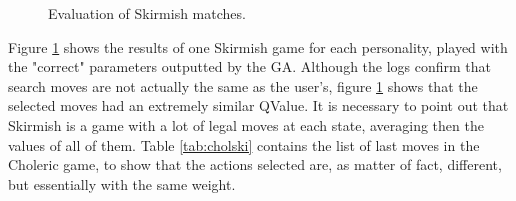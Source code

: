 \begin{figure}[ht!]
	\quad
  \captionsetup{justification=centering}
    \caption{Evaluation of Skirmish matches.}
    \label{fig:skirmishE}
\end{figure}
Figure \ref{fig:skirmishE} shows the results of one Skirmish game for each personality, played with the "correct" parameters outputted by the GA. Although the logs confirm that search moves are not actually the same as the user's, figure \ref{fig:skirmishE} shows that the selected moves had an extremely similar QValue. It is necessary to point out that Skirmish is a game with a lot of legal moves at each state, averaging then the values of all of them. Table \ref{tab:cholski} contains the list of last moves in the Choleric game, to show that the actions selected are, as matter of fact, different, but essentially with the same weight.
